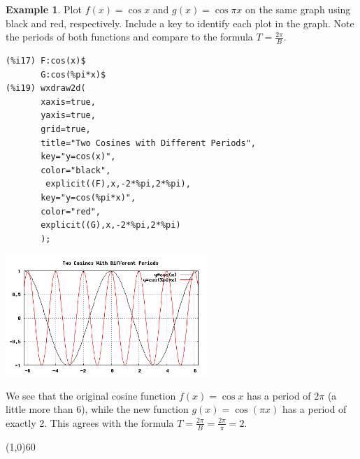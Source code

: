 \documentclass[10.5pt,twoside]{report}
\theoremstyle{definition}
\newtheorem{exmp}{Example}[section]
\begin{document}
\begin{exmp}

Plot $f(x)=\cos{x}$ and $g(x)=\cos{\pi x}$ on the same graph using black and red, respectively.  Include a key to identify each plot in the graph.  Note the periods of both functions and compare to the formula $T=\frac{2\pi}{B}$.\\


\begin{verbatim}
(%i17) F:cos(x)$
       G:cos(%pi*x)$
(%i19) wxdraw2d(
       xaxis=true,
       yaxis=true,
       grid=true,
       title="Two Cosines with Different Periods",
       key="y=cos(x)",
       color="black",
        explicit((F),x,-2*%pi,2*%pi),
       key="y=cos(%pi*x)",
       color="red",
       explicit((G),x,-2*%pi,2*%pi)
       );
\end{verbatim}

\includegraphics[width=3in]{example_1_2_5}

We see that the original cosine function $f(x)=\cos{x}$ has a period of $2\pi$ (a little more than 6), while the new function $g(x)=\cos{(\pi x)}$ has a period of exactly 2.  This agrees with the formula $T=\frac{2\pi}{B}=\frac{2\pi}{\pi}=2$.


\end{exmp}

\line(1,0){60}
\linethickness{0.5mm}
\end{document}
